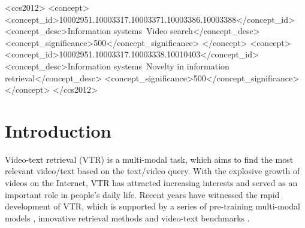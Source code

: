 \documentclass[sigconf]{acmart}
\begin{document}
\begin{CCSXML}
<ccs2012>
   <concept>
       <concept_id>10002951.10003317.10003371.10003386.10003388</concept_id>
       <concept_desc>Information systems~Video search</concept_desc>
       <concept_significance>500</concept_significance>
       </concept>
   <concept>
       <concept_id>10002951.10003317.10003338.10010403</concept_id>
       <concept_desc>Information systems~Novelty in information retrieval</concept_desc>
       <concept_significance>500</concept_significance>
       </concept>
 </ccs2012>
\end{CCSXML}






\maketitle

\section{Introduction} \label{sec:intro}

Video-text retrieval (VTR) is a multi-modal task, which aims to find the most relevant video/text based on the text/video query. With the explosive growth of videos on the Internet, VTR has attracted increasing interests and served as an important role in people's daily life. Recent years have witnessed the rapid development of VTR, which is supported by a series of pre-training multi-modal models \cite{radford2021learning,lei2021less,bain2021frozen}, innovative retrieval methods \cite{yu2018joint,zhu2020actbert,lei2021less,liu2019use,gabeur2020multi,dzabraev2021mdmmt,mithun2018learning,zhang2018cross,liu2021hit,dong2019dual,bertasius2021space,arnab2021vivit,luo2021clip4clip,DBLP:conf/sigir/JinZZZHZ21,DBLP:conf/sigir/YangD0W0C20,DBLP:conf/cvpr/WangZ021} and video-text benchmarks \cite{caba2015activitynet,xu2016msr,chen2011collecting,rohrbach2015long,anne2017localizing}.
\end{document}
